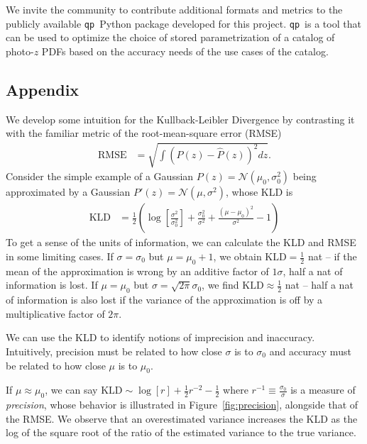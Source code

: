 \documentclass[\docopts]{\docclass}
\newcommand{\qp}{\texttt{qp}}
\newcommand{\pz}{photo-$z$ PDF}
\begin{document}
We invite the community to contribute additional formats and metrics to the 
publicly available \qp\ Python package developed for this project.  \qp\ is a 
tool that can be used to optimize the choice of stored parametrization of a 
catalog of \pz s based on the accuracy needs of the use cases of the catalog.


\subsection*{Appendix}
\label{sec:kld}

We develop some intuition for the Kullback-Leibler Divergence by contrasting it 
with the familiar metric of the root-mean-square error (RMSE)
\begin{align}
  \label{eq:rmse}
  \mathrm{RMSE} &= \sqrt{\int (P(z) - \hat{P}(z))^{2} dz}.
\end{align}
Consider the simple example of a Gaussian $P(z)=\mathcal{N}(\mu_{0}, 
\sigma_{0}^{2})$ being approximated by a Gaussian $P'(z)=\mathcal{N}(\mu, 
\sigma^{2})$, whose KLD is
\begin{align}
  \label{eq:gaussian}
  \mathrm{KLD} &= 
\frac{1}{2}\left(\log\left[\frac{\sigma^{2}}{\sigma_{0}^{2}}\right] + 
\frac{\sigma_{0}^{2}}{\sigma^{2}} + \frac{(\mu-\mu_{0})^{2}}{\sigma^{2}} - 
1\right)
\end{align}
To get a sense of the units of information, we can calculate the KLD and RMSE 
in some limiting cases.
If $\sigma=\sigma_{0}$ but $\mu=\mu_{0}+1$, we obtain 
$\mathrm{KLD}=\frac{1}{2}$ nat -- if the mean of the approximation is wrong by 
an additive factor of $1\sigma$, half a nat of information is lost.
If $\mu=\mu_{0}$ but $\sigma=\sqrt{2\pi}\sigma_{0}$, we find 
$\mathrm{KLD}\approx\frac{1}{2}$ nat -- half a nat of information is also lost 
if the variance of the approximation is off by a multiplicative factor of 
$2\pi$.

We can use the KLD to identify notions of imprecision and inaccuracy.
Intuitively, precision must be related to how close $\sigma$ is to $\sigma_{0}$ 
and accuracy must be related to how close $\mu$ is to $\mu_{0}$.

If $\mu\approx\mu_{0}$, we can say $\mathrm{KLD}\sim\log[r] + \frac{1}{2}r^{-2} 
- \frac{1}{2}$ where $r^{-1}\equiv\frac{\sigma_{0}}{\sigma}$ is a measure of 
\textit{precision}, whose behavior is illustrated in 
Figure~\ref{fig:precision}, alongside that of the RMSE.  We observe that an 
overestimated variance increases the KLD as the log of the square root of the 
ratio of the estimated variance to the true variance.
\end{document}
